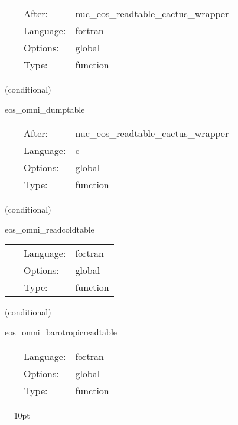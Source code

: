 \hspace{5mm}

 \begin{tabular*}{160mm}{cll} 
~ & After:  & nuc\_eos\_readtable\_cactus\_wrapper \\ 
~ & Language:  & fortran \\ 
~ & Options:  & global \\ 
~ & Type:  & function \\ 
\end{tabular*} 


\vspace{5mm}

   (conditional) 

\hspace{5mm} eos\_omni\_dumptable 

\hspace{5mm}{\it dump eos hdf5 table in ascii } 


\hspace{5mm}

 \begin{tabular*}{160mm}{cll} 
~ & After:  & nuc\_eos\_readtable\_cactus\_wrapper \\ 
~ & Language:  & c \\ 
~ & Options:  & global \\ 
~ & Type:  & function \\ 
\end{tabular*} 


\vspace{5mm}

   (conditional) 

\hspace{5mm} eos\_omni\_readcoldtable 

\hspace{5mm}{\it read cold eos ascii table } 


\hspace{5mm}

 \begin{tabular*}{160mm}{cll} 
~ & Language:  & fortran \\ 
~ & Options:  & global \\ 
~ & Type:  & function \\ 
\end{tabular*} 


\vspace{5mm}

   (conditional) 

\hspace{5mm} eos\_omni\_barotropicreadtable 

\hspace{5mm}{\it read barotropic eos ascii table } 


\hspace{5mm}

 \begin{tabular*}{160mm}{cll} 
~ & Language:  & fortran \\ 
~ & Options:  & global \\ 
~ & Type:  & function \\ 
\end{tabular*} 



\vspace{5mm}\parskip = 10pt 

